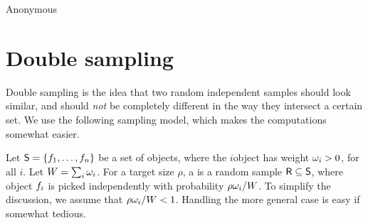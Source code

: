 % 

%


\ChapterPrefix{}
\ChapterGen{}



%
{}%
{Anonymous}

\bigskip%





\section{Double sampling}

Double sampling is the idea that two random independent samples should
look similar, and should \emph{not} be completely different in the way
they intersect a certain set. We use the following sampling model,
which makes the computations somewhat easier.

\begin{defn}
    Let $\mathsf{S} = \left\{ { f_1, \ldots, f_n} \right\}$ be a set of objects,
    where the $i$\th object has weight $\omega_i > 0$, for all $i$. Let
    $W = \sum_i \omega_i$.  For a target size $\rho$, a
     is a random sample
    $\mathsf{R} \subseteq \mathsf{S}$, where object $f_i$ is picked
    independently with probability
    $\displaystyle \rho \omega_i / W$. To simplify the discussion,
    we assume that $\rho \omega_i / W < 1$. Handling the more
    general case is easy if somewhat tedious.
\end{defn}



